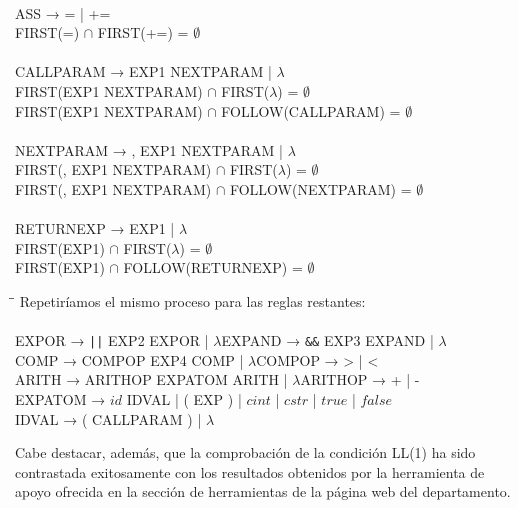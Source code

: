 \begin{tabbing}
    \\
    ASS → = | +=\\
    \>FIRST(=) $\cap$ FIRST(+=) = $\emptyset$\\
    \\
    CALLPARAM → EXP1 NEXTPARAM | $\lambda$\\
    \>FIRST(EXP1 NEXTPARAM) $\cap$ FIRST($\lambda$) = $\emptyset$\\
    \>FIRST(EXP1 NEXTPARAM) $\cap$ FOLLOW(CALLPARAM) = $\emptyset$\\
    \\
    NEXTPARAM → , EXP1 NEXTPARAM | $\lambda$\\
    \>FIRST(, EXP1 NEXTPARAM) $\cap$ FIRST($\lambda$) = $\emptyset$\\
    \>FIRST(, EXP1 NEXTPARAM) $\cap$ FOLLOW(NEXTPARAM) = $\emptyset$\\
    \\
    RETURNEXP → EXP1 | $\lambda$\\
    \>FIRST(EXP1) $\cap$ FIRST($\lambda$) = $\emptyset$\\
    \>FIRST(EXP1) $\cap$ FOLLOW(RETURNEXP) = $\emptyset$\\
\end{tabbing}
\begin{tabbing}
    \hspace{0.5cm}\=\hspace{10cm}\=\kill
    Repetiríamos el mismo proceso para las reglas restantes:\\
    \\
    \>EXPOR → \verb!||! EXP2 EXPOR | $\lambda$\>EXPAND → \verb!&&! EXP3 EXPAND | $\lambda$\\
    \>COMP → COMPOP EXP4 COMP | $\lambda$\>COMPOP → > | <\\
    \>ARITH → ARITHOP EXPATOM ARITH | $\lambda$\>ARITHOP → + | -\\
    \>EXPATOM → $id$ IDVAL | ( EXP ) | $cint$ | $cstr$ | $true$ | $false$\\
    \>IDVAL → ( CALLPARAM ) | $\lambda$
\end{tabbing}
Cabe destacar, además, que la comprobación de la condición LL(1) ha sido contrastada exitosamente con los resultados obtenidos por la herramienta de apoyo ofrecida en la sección de herramientas de la página web del departamento.\\
